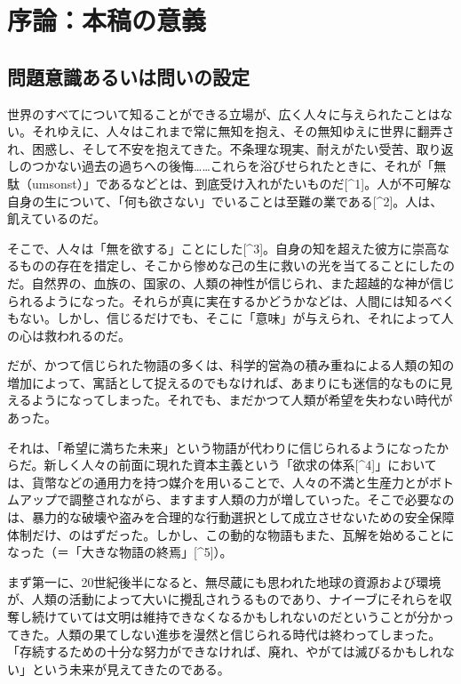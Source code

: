 \section{序論：本稿の意義}\label{ux5e8fux8ad6ux672cux7a3fux306eux610fux7fa9}

\subsection{問題意識あるいは問いの設定}\label{ux554fux984cux610fux8b58ux3042ux308bux3044ux306fux554fux3044ux306eux8a2dux5b9a}

世界のすべてについて知ることができる立場が、広く人々に与えられたことはない。それゆえに、人々はこれまで常に無知を抱え、その無知ゆえに世界に翻弄され、困惑し、そして不安を抱えてきた。不条理な現実、耐えがたい受苦、取り返しのつかない過去の過ちへの後悔\ldots\ldots これらを浴びせられたときに、それが「無駄（umsonst）」であるなどとは、到底受け入れがたいものだ{[}\^{}1{]}。人が不可解な自身の生について、「何も欲さない」でいることは至難の業である{[}\^{}2{]}。人は、飢えているのだ。

そこで、人々は「無を欲する」ことにした{[}\^{}3{]}。自身の知を超えた彼方に崇高なるものの存在を措定し、そこから惨めな己の生に救いの光を当てることにしたのだ。自然界の、血族の、国家の、人類の神性が信じられ、また超越的な神が信じられるようになった。それらが真に実在するかどうかなどは、人間には知るべくもない。しかし、信じるだけでも、そこに「意味」が与えられ、それによって人の心は救われるのだ。

だが、かつて信じられた物語の多くは、科学的営為の積み重ねによる人類の知の増加によって、寓話として捉えるのでもなければ、あまりにも迷信的なものに見えるようになってしまった。それでも、まだかつて人類が希望を失わない時代があった。

それは、「希望に満ちた未来」という物語が代わりに信じられるようになったからだ。新しく人々の前面に現れた資本主義という「欲求の体系{[}\^{}4{]}」においては、貨幣などの通用力を持つ媒介を用いることで、人々の不満と生産力とがボトムアップで調整されながら、ますます人類の力が増していった。そこで必要なのは、暴力的な破壊や盗みを合理的な行動選択として成立させないための安全保障体制だけ、のはずだった。しかし、この動的な物語もまた、瓦解を始めることになった（＝「大きな物語の終焉」{[}\^{}5{]}）。

まず第一に、20世紀後半になると、無尽蔵にも思われた地球の資源および環境が、人類の活動によって大いに攪乱されうるものであり、ナイーブにそれらを収奪し続けていては文明は維持できなくなるかもしれないのだということが分かってきた。人類の果てしない進歩を漫然と信じられる時代は終わってしまった。「存続するための十分な努力ができなければ、廃れ、やがては滅びるかもしれない」という未来が見えてきたのである。

